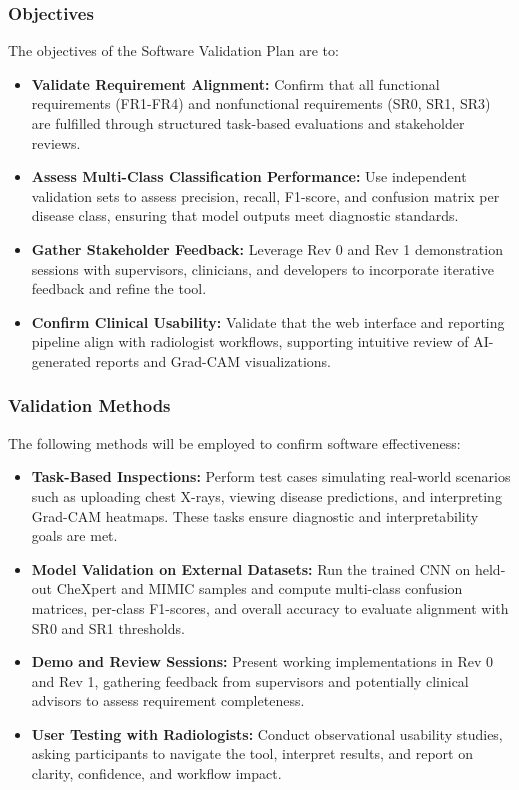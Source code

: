 \documentclass[12pt, titlepage]{article}
\begin{document}
\subsubsection{Objectives}
The objectives of the Software Validation Plan are to:
\begin{itemize}
  \item \textbf{Validate Requirement Alignment:} Confirm that all functional requirements (FR1-FR4) and nonfunctional requirements (SR0, SR1, SR3) are fulfilled through structured task-based evaluations and stakeholder reviews.
  \item \textbf{Assess Multi-Class Classification Performance:} Use independent validation sets to assess precision, recall, F1-score, and confusion matrix per disease class, ensuring that model outputs meet diagnostic standards.
  \item \textbf{Gather Stakeholder Feedback:} Leverage Rev 0 and Rev 1 demonstration sessions with supervisors, clinicians, and developers to incorporate iterative feedback and refine the tool.
  \item \textbf{Confirm Clinical Usability:} Validate that the web interface and reporting pipeline align with radiologist workflows, supporting intuitive review of AI-generated reports and Grad-CAM visualizations.
\end{itemize}

\subsubsection{Validation Methods}
The following methods will be employed to confirm software effectiveness:
\begin{itemize}
  \item \textbf{Task-Based Inspections:} Perform test cases simulating real-world scenarios such as uploading chest X-rays, viewing disease predictions, and interpreting Grad-CAM heatmaps. These tasks ensure diagnostic and interpretability goals are met.
  \item \textbf{Model Validation on External Datasets:} Run the trained CNN on held-out CheXpert and MIMIC samples and compute multi-class confusion matrices, per-class F1-scores, and overall accuracy to evaluate alignment with SR0 and SR1 thresholds.
  \item \textbf{Demo and Review Sessions:} Present working implementations in Rev 0 and Rev 1, gathering feedback from supervisors and potentially clinical advisors to assess requirement completeness.
  \item \textbf{User Testing with Radiologists:} Conduct observational usability studies, asking participants to navigate the tool, interpret results, and report on clarity, confidence, and workflow impact.
\end{itemize}
\end{document}
